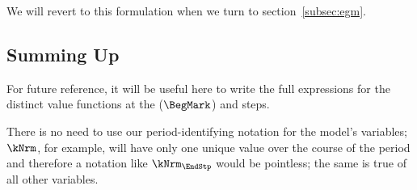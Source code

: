 \documentclass[\econtexRoot/SolvingMicroDSOPs]{subfiles}
\begin{document}
We will revert to this formulation when we turn to section~\ref{subsec:egm}.

\hypertarget{summing-up}{}
\subsection{Summing Up}\label{subsec:summing-up}
For future reference, it will be useful here to write the full expressions for the distinct value functions at the {\Arrival} ($\BegMark$) and {\Decision} {steps}.  %

There is no need to use our {period}-identifying notation for the model's variables; $\kNrm$, for example, will have only one unique value over the course of the {period} and therefore a notation like $\kNrm_{\EndStp}$ would be pointless; the same is true of all other variables.
\end{document}
